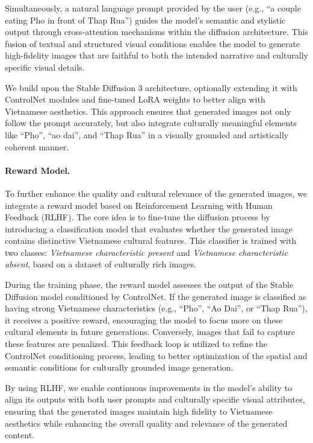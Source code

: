 \documentclass[conference]{IEEEtran}
\begin{document}
Simultaneously, a natural language prompt provided by the user (e.g., ``a couple eating Pho in front of Thap Rua'') guides the model's semantic and stylistic output through cross-attention mechanisms within the diffusion architecture. This fusion of textual and structured visual conditions enables the model to generate high-fidelity images that are faithful to both the intended narrative and culturally specific visual details.

We build upon the Stable Diffusion 3 architecture, optionally extending it with ControlNet modules and fine-tuned LoRA weights to better align with Vietnamese aesthetics. This approach ensures that generated images not only follow the prompt accurately, but also integrate culturally meaningful elements like ``Pho'', ``ao dai'', and ``Thap Rua'' in a visually grounded and artistically coherent manner.

\paragraph{Reward Model.}
To further enhance the quality and cultural relevance of the generated images, we integrate a reward model based on Reinforcement Learning with Human Feedback (RLHF). The core idea is to fine-tune the diffusion process by introducing a classification model that evaluates whether the generated image contains distinctive Vietnamese cultural features. This classifier is trained with two classes: \textit{Vietnamese characteristic present} and \textit{Vietnamese characteristic absent}, based on a dataset of culturally rich images.

During the training phase, the reward model assesses the output of the Stable Diffusion model conditioned by ControlNet. If the generated image is classified as having strong Vietnamese characteristics (e.g., ``Pho'', ``Ao Dai'', or ``Thap Rua''), it receives a positive reward, encouraging the model to focus more on these cultural elements in future generations. Conversely, images that fail to capture these features are penalized. This feedback loop is utilized to refine the ControlNet conditioning process, leading to better optimization of the spatial and semantic conditions for culturally grounded image generation.

By using RLHF, we enable continuous improvements in the model's ability to align its outputs with both user prompts and culturally specific visual attributes, ensuring that the generated images maintain high fidelity to Vietnamese aesthetics while enhancing the overall quality and relevance of the generated content.
\end{document}
